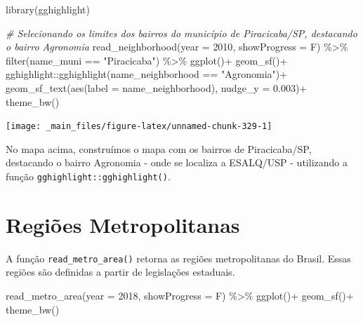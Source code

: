 \documentclass[
  brazilian,
]{book}
\newenvironment{Shaded}{\begin{snugshade}}{\end{snugshade}}
\newcommand{\AttributeTok}[1]{\textcolor[rgb]{0.77,0.63,0.00}{#1}}
\newcommand{\CommentTok}[1]{\textcolor[rgb]{0.56,0.35,0.01}{\textit{#1}}}
\newcommand{\DecValTok}[1]{\textcolor[rgb]{0.00,0.00,0.81}{#1}}
\newcommand{\FloatTok}[1]{\textcolor[rgb]{0.00,0.00,0.81}{#1}}
\newcommand{\FunctionTok}[1]{\textcolor[rgb]{0.00,0.00,0.00}{#1}}
\newcommand{\NormalTok}[1]{#1}
\newcommand{\SpecialCharTok}[1]{\textcolor[rgb]{0.00,0.00,0.00}{#1}}
\newcommand{\StringTok}[1]{\textcolor[rgb]{0.31,0.60,0.02}{#1}}
\begin{document}
\begin{Shaded}
\begin{Highlighting}[]
\FunctionTok{library}\NormalTok{(gghighlight)}

\CommentTok{\# Selecionando os limites dos bairros do município de Piracicaba/SP, destacando o bairro Agronomia}
\FunctionTok{read\_neighborhood}\NormalTok{(}\AttributeTok{year =} \DecValTok{2010}\NormalTok{,}
                  \AttributeTok{showProgress =}\NormalTok{ F) }\SpecialCharTok{\%\textgreater{}\%} 
  \FunctionTok{filter}\NormalTok{(name\_muni }\SpecialCharTok{==} \StringTok{"Piracicaba"}\NormalTok{) }\SpecialCharTok{\%\textgreater{}\%}
  \FunctionTok{ggplot}\NormalTok{()}\SpecialCharTok{+}
  \FunctionTok{geom\_sf}\NormalTok{()}\SpecialCharTok{+}
\NormalTok{  gghighlight}\SpecialCharTok{::}\FunctionTok{gghighlight}\NormalTok{(name\_neighborhood }\SpecialCharTok{==} \StringTok{"Agronomia"}\NormalTok{)}\SpecialCharTok{+}
  \FunctionTok{geom\_sf\_text}\NormalTok{(}\FunctionTok{aes}\NormalTok{(}\AttributeTok{label =}\NormalTok{ name\_neighborhood), }\AttributeTok{nudge\_y =} \FloatTok{0.003}\NormalTok{)}\SpecialCharTok{+}  
  \FunctionTok{theme\_bw}\NormalTok{()}
\end{Highlighting}
\end{Shaded}

\begin{center}\texttt{[image: \_main\_files/figure-latex/unnamed-chunk-329-1]} \end{center}

No mapa acima, construímos o mapa com os bairros de Piracicaba/SP, destacando o bairro Agronomia - onde se localiza a ESALQ/USP - utilizando a função \texttt{gghighlight::gghighlight()}.

\hypertarget{regiuxf5es-metropolitanas}{%
\section{Regiões Metropolitanas}\label{regiuxf5es-metropolitanas}}

A função \texttt{read\_metro\_area()} retorna as regiões metropolitanas do Brasil. Essas regiões são definidas a partir de legislações estaduais.

\begin{Shaded}
\begin{Highlighting}[]
\FunctionTok{read\_metro\_area}\NormalTok{(}\AttributeTok{year =} \DecValTok{2018}\NormalTok{,}
                \AttributeTok{showProgress =}\NormalTok{ F) }\SpecialCharTok{\%\textgreater{}\%} 
  \FunctionTok{ggplot}\NormalTok{()}\SpecialCharTok{+}
  \FunctionTok{geom\_sf}\NormalTok{()}\SpecialCharTok{+}
  \FunctionTok{theme\_bw}\NormalTok{()}
\end{Highlighting}
\end{Shaded}
\end{document}
